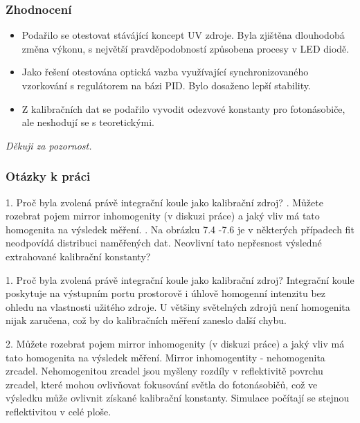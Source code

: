 \documentclass{beamer}
\begin{document}
\begin{frame}
\frametitle{Zhodnocení}
\begin{itemize}
 \item Podařilo se otestovat stávájící koncept UV zdroje. Byla zjištěna dlouhodobá změna výkonu, s největší pravděpodobností způsobena procesy v LED diodě.
 \item Jako řešení otestována optická vazba využívající synchronizovaného vzorkování s regulátorem na bázi PID. Bylo dosaženo lepší stability.
 \item Z kalibračních dat se podařilo vyvodit odezvové konstanty pro fotonásobiče, ale neshodují se s teoretickými.
\end{itemize}

\end{frame}


\begin{frame}{}
  \centering \Large
  \emph{Děkuji za pozornost.}
\end{frame}


\begin{frame}{}
\frametitle{Otázky k práci}
  
1. Proč byla zvolená právě integrační koule jako kalibrační zdroj?
. Můžete rozebrat pojem mirror inhomogenity (v diskuzi práce) a jaký vliv má tato homogenita na výsledek měření.
. Na obrázku 7.4 -7.6 je v některých případech fit neodpovídá distribuci naměřených dat. Neovlivní tato nepřesnost výsledné extrahované kalibrační konstanty?
\end{frame}


\begin{frame}{}
1. Proč byla zvolená právě integrační koule jako kalibrační zdroj?
\newline
\newline
\newline
Integrační koule poskytuje na výstupním portu prostorově i úhlově homogenní intenzitu bez ohledu na vlastnosti užitého zdroje. U většiny světelných zdrojů není homogenita nijak zaručena, což by do kalibračních měření zaneslo další chybu.

\end{frame}



\begin{frame}{}
2. Můžete rozebrat pojem mirror inhomogenity (v diskuzi práce) a jaký vliv má tato homogenita na výsledek měření.
\newline
\newline
\newline
Mirror inhomogentity - nehomogenita zrcadel. Nehomogenitou zrcadel jsou myšleny rozdíly v reflektivitě povrchu zrcadel, které mohou ovlivňovat fokusování světla do fotonásobičů, což ve výsledku může ovlivnit získané kalibrační konstanty. Simulace počítají se stejnou reflektivitou v celé ploše.

\end{frame}
\end{document}
